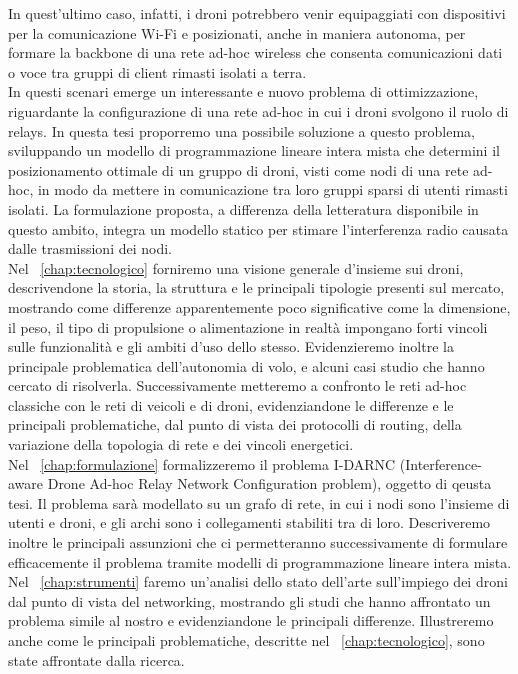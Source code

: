 In quest'ultimo caso, infatti, i droni potrebbero venir equipaggiati con dispositivi per la comunicazione Wi-Fi e posizionati, anche in maniera autonoma, per formare la backbone di una rete ad-hoc wireless che consenta comunicazioni dati o voce tra gruppi di client rimasti isolati a terra. \\
In questi scenari emerge un interessante e nuovo problema di ottimizzazione, riguardante la configurazione di una rete ad-hoc in cui i droni svolgono il ruolo di relays.
In questa tesi proporremo una possibile soluzione a questo problema, sviluppando un modello di programmazione lineare intera mista che determini il posizionamento ottimale di un gruppo di droni, visti come nodi di una rete ad-hoc, in modo da mettere in comunicazione tra loro gruppi sparsi di utenti rimasti isolati. La formulazione proposta, a differenza della letteratura disponibile in questo ambito, integra un modello statico per stimare l'interferenza radio causata dalle trasmissioni dei nodi. \\
Nel \chaptername\ \ref{chap:tecnologico} forniremo una visione generale d'insieme sui droni, descrivendone la storia, la struttura e le principali tipologie presenti sul mercato, mostrando come differenze apparentemente poco significative come la dimensione, il peso, il tipo di propulsione o alimentazione in realtà impongano forti vincoli sulle funzionalità e gli ambiti d'uso dello stesso. Evidenzieremo inoltre la principale problematica  dell'autonomia di volo, e alcuni casi studio che hanno cercato di risolverla.
Successivamente metteremo a confronto le reti ad-hoc classiche con le reti di veicoli e di droni, evidenziandone le differenze e le principali problematiche, dal punto di vista dei protocolli di routing, della variazione della topologia di rete e dei vincoli energetici.\\
Nel \chaptername\ \ref{chap:formulazione} formalizzeremo il problema I-DARNC (Interference-aware Drone Ad-hoc Relay Network Configuration problem), oggetto di qeusta tesi. Il problema sarà modellato su un grafo di rete, in cui i nodi sono l'insieme di utenti e droni, e gli archi sono i collegamenti stabiliti tra di loro. Descriveremo inoltre le principali assunzioni che ci permetteranno successivamente di formulare efficacemente il problema tramite modelli di programmazione lineare intera mista. \\
Nel \chaptername\ \ref{chap:strumenti} faremo un'analisi dello stato dell'arte sull'impiego dei droni dal punto di vista del networking, mostrando gli studi che hanno affrontato un problema simile al nostro e evidenziandone le principali differenze. Illustreremo anche come le principali problematiche, descritte nel \chaptername\ \ref{chap:tecnologico}, sono state affrontate dalla ricerca. 
